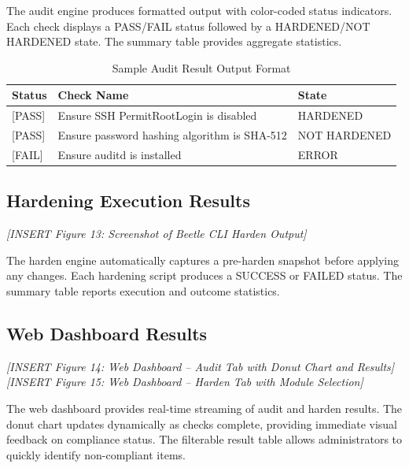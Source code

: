 The audit engine produces formatted output with color-coded status indicators. Each check displays a PASS/FAIL status followed by a HARDENED/NOT HARDENED state. The summary table provides aggregate statistics.

\begin{table}[H]
\centering
\caption{Sample Audit Result Output Format}
\begin{tabular}{|l|l|l|}
\hline
\textbf{Status} & \textbf{Check Name} & \textbf{State} \\
\hline
{[PASS]} & Ensure SSH PermitRootLogin is disabled & HARDENED \\
\hline
{[PASS]} & Ensure password hashing algorithm is SHA-512 & NOT HARDENED \\
\hline
{[FAIL]} & Ensure auditd is installed & ERROR \\
\hline
\end{tabular}
\label{tab:auditresult}
\end{table}

\subsection{Hardening Execution Results}

\vspace{0.5cm}
\noindent\textit{[INSERT Figure 13: Screenshot of Beetle CLI Harden Output]}
\vspace{0.5cm}

The harden engine automatically captures a pre-harden snapshot before applying any changes. Each hardening script produces a SUCCESS or FAILED status. The summary table reports execution and outcome statistics.

\subsection{Web Dashboard Results}

\vspace{0.5cm}
\noindent\textit{[INSERT Figure 14: Web Dashboard -- Audit Tab with Donut Chart and Results]}
\vspace{0.5cm}
\noindent\textit{[INSERT Figure 15: Web Dashboard -- Harden Tab with Module Selection]}
\vspace{0.5cm}

The web dashboard provides real-time streaming of audit and harden results. The donut chart updates dynamically as checks complete, providing immediate visual feedback on compliance status. The filterable result table allows administrators to quickly identify non-compliant items.


